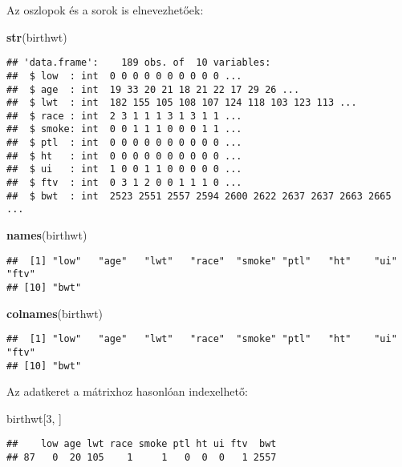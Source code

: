\documentclass[]{book}
\newenvironment{Shaded}{\begin{snugshade}}{\end{snugshade}}
\newcommand{\DecValTok}[1]{\textcolor[rgb]{0.00,0.00,0.81}{#1}}
\newcommand{\KeywordTok}[1]{\textcolor[rgb]{0.13,0.29,0.53}{\textbf{#1}}}
\newcommand{\NormalTok}[1]{#1}
\begin{document}
Az oszlopok és a sorok is elnevezhetőek:

\begin{Shaded}
\begin{Highlighting}[]
\KeywordTok{str}\NormalTok{(birthwt)}
\end{Highlighting}
\end{Shaded}

\begin{verbatim}
## 'data.frame':    189 obs. of  10 variables:
##  $ low  : int  0 0 0 0 0 0 0 0 0 0 ...
##  $ age  : int  19 33 20 21 18 21 22 17 29 26 ...
##  $ lwt  : int  182 155 105 108 107 124 118 103 123 113 ...
##  $ race : int  2 3 1 1 1 3 1 3 1 1 ...
##  $ smoke: int  0 0 1 1 1 0 0 0 1 1 ...
##  $ ptl  : int  0 0 0 0 0 0 0 0 0 0 ...
##  $ ht   : int  0 0 0 0 0 0 0 0 0 0 ...
##  $ ui   : int  1 0 0 1 1 0 0 0 0 0 ...
##  $ ftv  : int  0 3 1 2 0 0 1 1 1 0 ...
##  $ bwt  : int  2523 2551 2557 2594 2600 2622 2637 2637 2663 2665 ...
\end{verbatim}

\begin{Shaded}
\begin{Highlighting}[]
\KeywordTok{names}\NormalTok{(birthwt)}
\end{Highlighting}
\end{Shaded}

\begin{verbatim}
##  [1] "low"   "age"   "lwt"   "race"  "smoke" "ptl"   "ht"    "ui"    "ftv"  
## [10] "bwt"
\end{verbatim}

\begin{Shaded}
\begin{Highlighting}[]
\KeywordTok{colnames}\NormalTok{(birthwt)}
\end{Highlighting}
\end{Shaded}

\begin{verbatim}
##  [1] "low"   "age"   "lwt"   "race"  "smoke" "ptl"   "ht"    "ui"    "ftv"  
## [10] "bwt"
\end{verbatim}

Az adatkeret a mátrixhoz hasonlóan indexelhető:

\begin{Shaded}
\begin{Highlighting}[]
\NormalTok{birthwt[}\DecValTok{3}\NormalTok{, ]}
\end{Highlighting}
\end{Shaded}

\begin{verbatim}
##    low age lwt race smoke ptl ht ui ftv  bwt
## 87   0  20 105    1     1   0  0  0   1 2557
\end{verbatim}
\end{document}
